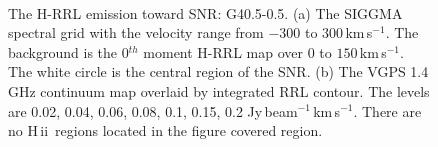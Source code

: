 \documentclass[manuscript]{aastex61}
\newcommand{\hii}{{\rm H\,}{{\sc ii}}}
\newcommand{\kms}{\,km\,s$^{-1}$}
\begin{document}
\begin{figure}[H]
	\centering
	\\
	\caption{The H-RRL emission toward SNR: G40.5-0.5.
	(a) The SIGGMA spectral grid with the velocity range from $-300$ to $300$\kms.
	The background is the 0$^{th}$ moment H-RRL map over $0$ to $150$\kms.
	The white circle is the central region of the SNR.
	(b) The VGPS 1.4 GHz continuum map overlaid by integrated RRL contour.
	The levels are 0.02, 0.04, 0.06, 0.08, 0.1, 0.15, 0.2 Jy\,beam$^{-1}$\kms.
	There are no \hii\ regions located in the figure covered region.
	}
	\label{fig_snr-g405}
\end{figure}
\end{document}
